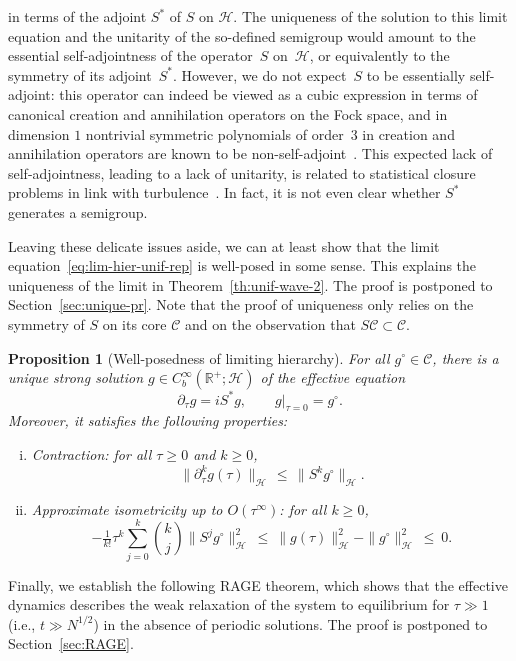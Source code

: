 \documentclass[a4paper,11pt,reqno,noindent]{amsart}
\theoremstyle{plain}
\newtheorem{prop}[lem]{Proposition}
\numberwithin{equation}{section}
\newcommand{\R}{\mathbb R}
\newcommand{\Cc}{\mathcal C}
\newcommand{\Hc}{\mathcal H}
\newcommand{\3}{|\!|\!|}
\begin{document}
in terms of the adjoint $S^*$ of $S$ on $\Hc$.
The uniqueness of the solution to this limit equation and the unitarity of the so-defined semigroup would amount to the essential self-adjointness of the operator~$S$ on~$\Hc$, or equivalently to the symmetry of its adjoint~$S^*$.
However, we do not expect~$S$ to be essentially self-adjoint:
this operator can indeed be viewed as a cubic expression in terms of canonical creation and annihilation operators on the Fock space, and in dimension $1$ nontrivial symmetric polynomials of order~$3$ in creation and annihilation operators are known to be non-self-adjoint~\cite{Rabsztyn-89,Otte-03}.
This expected lack of self-adjointness, leading to a lack of unitarity, is related to statistical closure problems in link with turbulence~\cite{Krommes-02}.
In fact, it is not even clear whether $S^*$ generates a semigroup.

Leaving these delicate issues aside, we can at least show that the limit equation~\eqref{eq:lim-hier-unif-rep} is well-posed in some sense. This explains the uniqueness of the limit in Theorem~\ref{th:unif-wave-2}.
The proof is postponed to Section~\ref{sec:unique-pr}. Note that the proof of uniqueness only relies on the symmetry of $S$ on its core $\Cc$ and on the observation that $S\Cc\subset\Cc$.

\begin{prop}[Well-posedness of limiting hierarchy]\label{prop:unique}
For all $g^\circ\in\Cc$, there is a unique strong solution $g\in C^\infty_b(\R^+;\Hc)$ of the effective equation
\begin{equation}\label{eq:limit-eqn-wellposed}
\partial_\tau g=iS^*g,\qquad g|_{\tau=0}=g^\circ.
\end{equation}
Moreover, it satisfies the following properties:
\begin{enumerate}[(i)]
\item \emph{Contraction:} for all $\tau\ge0$ and $k\ge0$,
\[\|\partial_\tau^kg(\tau)\|_\Hc\,\le\,\|S^kg^\circ\|_\Hc.\]
\item \emph{Approximate isometricity up to $O(\tau^\infty)$:} for all $k\ge0$,
\[-\tfrac{1}{k!}\tau^k\sum_{j=0}^k\binom{k}{j}\|S^{j}g^\circ\|_\Hc^2~\le~\|g(\tau)\|_\Hc^2-\|g^\circ\|_\Hc^2~\le~0.\]
\end{enumerate}
\end{prop}

Finally, we establish the following RAGE theorem, {which shows that the effective dynamics describes the weak relaxation of the system to equilibrium for $\tau\gg1$ (i.e., $t\gg N^{1/2}$) in the absence of periodic solutions.}
The proof is postponed to Section~\ref{sec:RAGE}.
\end{document}
